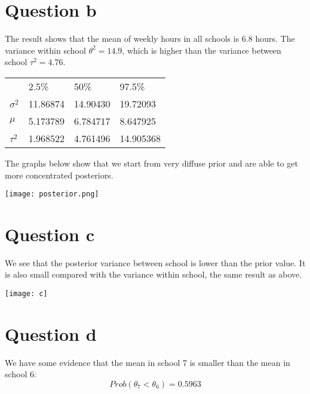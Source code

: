 \documentclass[12pt]{article}
\title{}
\author{}
\date{}
\begin{document}

\section*{Question b}

The result shows that the mean of weekly hours in all schools is 6.8 hours. The variance within school $\theta^{2} = 14.9$, which is higher than the variance between school $\tau^{2}=4.76$.

\begin{center}
\begin{tabular}{llll}
\toprule
& 2.5\% & 50\% & 97.5\% \\
$\sigma^{2}$ & 11.86874 & 14.90430 & 19.72093 \\
$\mu$ & 5.173789 & 6.784717 & 8.647925 \\
$\tau^{2}$ & 1.968522 & 4.761496 & 14.905368 \\
\bottomrule
\end{tabular}
\end{center}

The graphs below show  that we start from very diffuse prior and are able to get more concentrated posteriors.

\begin{center}
\texttt{[image: posterior.png]}
\end{center}

\section*{Question c}
We see that the posterior variance between school is lower than the prior value. It is also small compared with the variance within school, the same result as above.

\begin{center}
\texttt{[image: c]}
\end{center}

\section*{Question d}

We have some evidence that the mean in school 7 is smaller than the mean in school 6:
\begin{equation}
Prob(\theta_{7} < \theta_{6}) = 0.5963
\end{equation}
\end{document}
